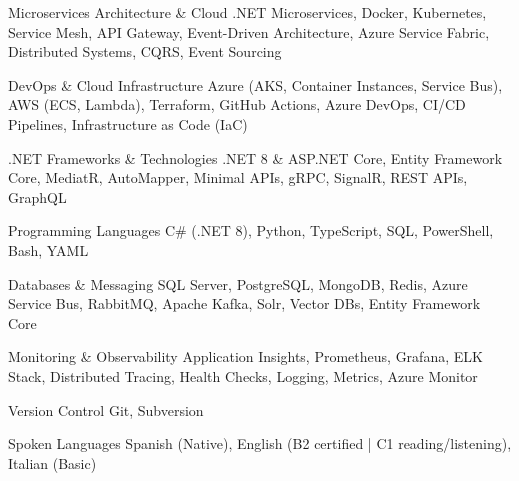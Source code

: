 
\begin{cvskills}
    \cvskill
    {Microservices Architecture \& Cloud}
    {.NET Microservices, Docker, Kubernetes, Service Mesh, API Gateway, Event-Driven Architecture, 
     Azure Service Fabric, Distributed Systems, CQRS, Event Sourcing}

    \cvskill
    {DevOps \& Cloud Infrastructure}
    {Azure (AKS, Container Instances, Service Bus), AWS (ECS, Lambda), Terraform, 
     GitHub Actions, Azure DevOps, CI/CD Pipelines, Infrastructure as Code (IaC)}

    \cvskill
    {.NET Frameworks \& Technologies}
    {.NET 8 \& ASP.NET Core, Entity Framework Core, MediatR, AutoMapper, 
     Minimal APIs, gRPC, SignalR, REST APIs, GraphQL}

    \cvskill
    {Programming Languages}
    {C\# (.NET 8), Python, TypeScript, SQL, PowerShell, Bash, YAML}

    \cvskill
    {Databases \& Messaging}
    {SQL Server, PostgreSQL, MongoDB, Redis, Azure Service Bus, RabbitMQ, 
     Apache Kafka, Solr, Vector DBs, Entity Framework Core}

    \cvskill
    {Monitoring \& Observability}
    {Application Insights, Prometheus, Grafana, ELK Stack, Distributed Tracing, 
     Health Checks, Logging, Metrics, Azure Monitor}

    \cvskill
    {Version Control}
    {Git, Subversion}

    \cvskill
    {Spoken Languages}
    {Spanish (Native), English (B2 certified | C1 reading/listening), Italian (Basic)}
\end{cvskills}
